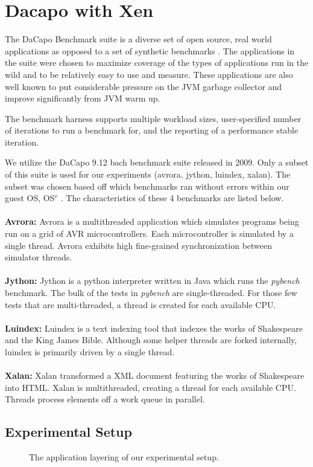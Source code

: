 \documentclass{sig-alternate}
\begin{document}
\section{Dacapo with Xen}
The DaCapo Benchmark suite is a diverse set of open source, real world applications as opposed to a set of synthetic benchmarks \cite{blackburn2006dacapo}. The applications in the suite were chosen to maximize coverage of the types of applications run in the wild and to be relatively easy to use and measure. These applications are also well known to put considerable pressure on the JVM garbage collector and improve significantly from JVM warm up. 

The benchmark harness supports multiple workload sizes, user-specified number of iterations to run a benchmark for, and the reporting of a performance stable iteration.

We utilize the DaCapo 9.12 bach benchmark suite released in 2009. Only a subset of this suite is used for our experiments (avrora, jython, luindex, xalan). The subset was chosen based off which benchmarks ran without errors within our guest OS, OS$^{v}$ \cite{aviOSv2014}. The characteristics of these 4 benchmarks are listed below.
\\\\
\textbf{Avrora:} Avrora is a multithreaded application which simulates programs being run on a grid of AVR microcontrollers. Each microcontroller is simulated by a single thread. Avrora exhibits high fine-grained synchronization between simulator threads.
\\\\
\textbf{Jython:} Jython is a python interpreter written in Java which runs the \textit{pybench} benchmark. The bulk of the tests in \textit{pybench} are single-threaded. For those few tests that are multi-threaded, a thread is created for each available CPU. 
\\\\
\textbf{Luindex:} Luindex is a text indexing tool that indexes the works of Shakespeare and the King James Bible. Although some helper threads are forked internally, luindex is primarily driven by a single thread.
\\\\
\textbf{Xalan:} Xalan transformed a XML document featuring the works of Shakespeare into HTML. Xalan is multithreaded, creating a thread for each available CPU. Threads process elements off a work queue in parallel.

\subsection{Experimental Setup}\label{subsec:expsetup}
\begin{figure}
\centering
{}
\caption{The application layering of our experimental setup.}
\label{fig:dacaposetup}
\end{figure}
\end{document}
